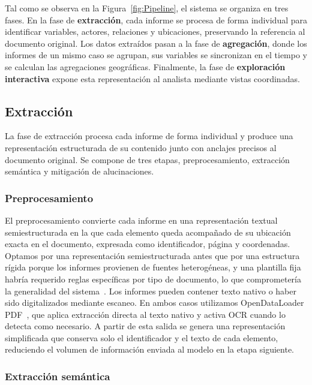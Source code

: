Tal como se observa en la Figura~\ref{fig:Pipeline}, el sistema 
se organiza en tres fases. En la fase de \textbf{extracción}, 
cada informe se procesa de forma individual para identificar 
variables, actores, relaciones y ubicaciones, preservando la 
referencia al documento original. Los datos extraídos pasan a la 
fase de \textbf{agregación}, donde los informes de un mismo caso 
se agrupan, sus variables se sincronizan en el tiempo y se 
calculan las agregaciones geográficas. Finalmente, la fase de 
\textbf{exploración interactiva} expone esta representación al 
analista mediante vistas coordinadas.

\subsection{Extracción}

La fase de extracción procesa cada informe de forma individual 
y produce una representación estructurada de su contenido junto 
con anclajes precisos al documento original. Se compone de tres 
etapas, preprocesamiento, extracción semántica y mitigación de 
alucinaciones.

\subsubsection{Preprocesamiento}

El preprocesamiento convierte cada informe en una representación 
textual semiestructurada en la que cada elemento queda acompañado 
de su ubicación exacta en el documento, expresada como 
identificador, página y coordenadas. Optamos por una 
representación semiestructurada antes que por una estructura 
rígida porque los informes provienen de fuentes heterogéneas, y 
una plantilla fija habría requerido reglas específicas por tipo 
de documento, lo que comprometería la generalidad del 
sistema~\cite{cattan2021crossdoc}. Los informes pueden contener 
texto nativo o haber sido digitalizados mediante escaneo. En 
ambos casos utilizamos OpenDataLoader 
\ac{PDF}~\cite{opendataloader2024}, que aplica extracción directa al 
texto nativo y activa \ac{OCR} cuando lo detecta como necesario. A 
partir de esta salida se genera una representación simplificada 
que conserva solo el identificador y el texto de cada elemento, 
reduciendo el volumen de información enviada al modelo en la 
etapa siguiente.

\subsubsection{Extracción semántica}

